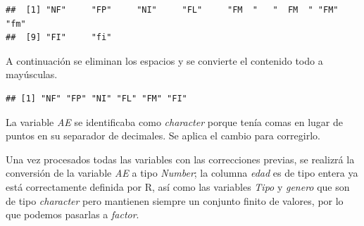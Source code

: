 \documentclass[
]{article}
\newenvironment{Shaded}{\begin{snugshade}}{\end{snugshade}}
\newcommand{\AttributeTok}[1]{\textcolor[rgb]{0.77,0.63,0.00}{#1}}
\newcommand{\ConstantTok}[1]{\textcolor[rgb]{0.00,0.00,0.00}{#1}}
\newcommand{\FunctionTok}[1]{\textcolor[rgb]{0.00,0.00,0.00}{#1}}
\newcommand{\NormalTok}[1]{#1}
\newcommand{\OtherTok}[1]{\textcolor[rgb]{0.56,0.35,0.01}{#1}}
\newcommand{\SpecialCharTok}[1]{\textcolor[rgb]{0.00,0.00,0.00}{#1}}
\newcommand{\StringTok}[1]{\textcolor[rgb]{0.31,0.60,0.02}{#1}}
\begin{document}
\begin{verbatim}
##  [1] "NF"     "FP"     "NI"     "FL"     "FM  "   "  FM  " "FM"     "fm"    
##  [9] "FI"     "fi"
\end{verbatim}

\vspace{0.3cm}

A continuación se eliminan los espacios y se convierte el contenido todo
a mayúsculas.

\vspace{0.3cm}

\begin{Shaded}
\end{Shaded}

\begin{verbatim}
## [1] "NF" "FP" "NI" "FL" "FM" "FI"
\end{verbatim}

\vspace{0.3cm}

La variable \emph{AE} se identificaba como \emph{character} porque tenía
comas en lugar de puntos en su separador de decimales. Se aplica el
cambio para corregirlo.

\vspace{0.3cm}

\begin{Shaded}
\end{Shaded}

\vspace{0.3cm}

Una vez procesados todas las variables con las correcciones previas, se
realizrá la conversión de la variable \emph{AE} a tipo \emph{Number}; la
columna \emph{edad} es de tipo entera ya está correctamente definida por
R, así como las variables \emph{Tipo} y \emph{genero} que son de tipo
\emph{character} pero mantienen siempre un conjunto finito de valores,
por lo que podemos pasarlas a \emph{factor}.
\end{document}
